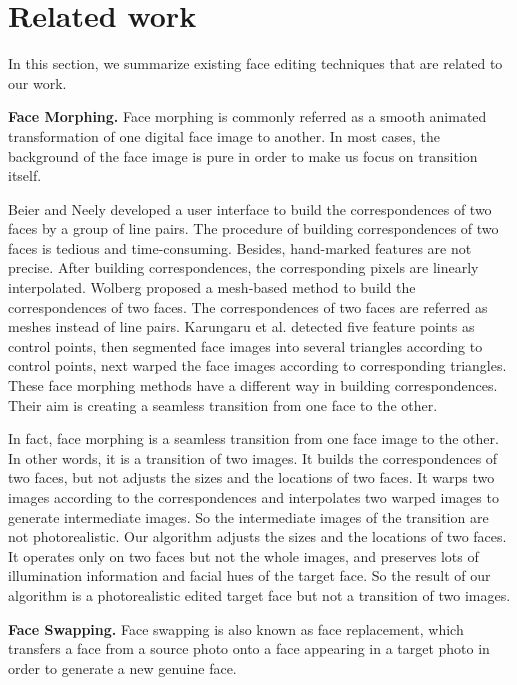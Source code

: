 \section{Related work}

In this section, we summarize existing face editing techniques that are related to our work.

\noindent\textbf{Face Morphing.} Face morphing is commonly referred as a smooth animated transformation of one digital face image to another. 
In most cases, the background of the face image is pure in order to make us focus on transition itself. 

Beier and Neely \cite{fbim} developed a user interface to build the correspondences of two faces by a group of line pairs. 
The procedure of building correspondences of two faces is tedious and time-consuming. Besides, hand-marked features are not precise. After building correspondences, the corresponding pixels are linearly interpolated.  
Wolberg \cite{wol} proposed a mesh-based method to build the correspondences of two faces. 
The correspondences of two faces are referred as meshes instead of line pairs. Karungaru et al. \cite{mhf} detected five feature points as control points, then segmented face images into several triangles according to control points, next warped the face images according to corresponding triangles. These face morphing methods have a different way in building correspondences. Their aim is creating a seamless transition from one face to the other.

 In fact, face morphing is a seamless transition from one face image to the other. In other words, it is a transition of two images. It builds the correspondences of two faces, but not adjusts the sizes and the locations of two faces. It warps two images according to the correspondences and interpolates two warped images to generate intermediate images. So the intermediate images of the transition are not photorealistic. Our algorithm adjusts  the sizes and the locations of two faces. It operates only on two faces but not the whole images, and preserves lots of illumination information and facial hues of the target face. So the result of our algorithm is a photorealistic edited target face but not a transition of two images.

\noindent\textbf{Face Swapping.} Face swapping is also known as face replacement, which transfers a face from a source photo onto a face appearing in a target photo in order to generate a new genuine face.

